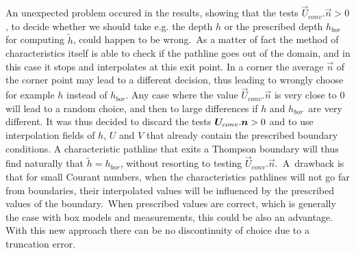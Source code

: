 An unexpected problem occured in the results, showing that the tests $%
\vec{U}_{conv}.\vec{n}>0$, to decide whether we should
take e.g. the depth $h$ or the prescribed depth $h_{bor}$ for computing $%
\widetilde{h}$, could happen to be wrong.\ As a matter of fact the method of
characteristics itself is able to check if the pathline goes out of the
domain, and in this case it stops and interpolates at this exit point. In a
corner the average $\vec{n}$ of the corner point may lead to a
different decision, thus leading to wrongly choose for example $h$ instead
of $h_{bor}$. Any case where the value $\vec{U}_{conv}.%
\vec{n}$ is very close to 0 will lead to a random choice, and
then to large differences if $h$ and $h_{bor}$\ are very different. It was
thus decided to discard the tests $\vec{U}_{conv}.\vec{%
n}>0$ and to use interpolation fields of $h$, $U$ and $V$ that already
contain the prescribed boundary conditions. A characteristic pathline that
exits a Thompson boundary will thus find naturally that $\widetilde{h}%
=h_{bor}$, without resorting to testing $\vec{U}_{conv}.%
\vec{n}$.\ A\ drawback is that for small Courant numbers, when
the characteristics pathlines will not go far from boundaries, their
interpolated values will be influenced by the prescribed values of the
boundary.\ When prescribed values are correct, which is generally the case
with box models and measurements, this could be also an advantage. With this
new approach there can be no discontinuity of choice due to a truncation
error.
